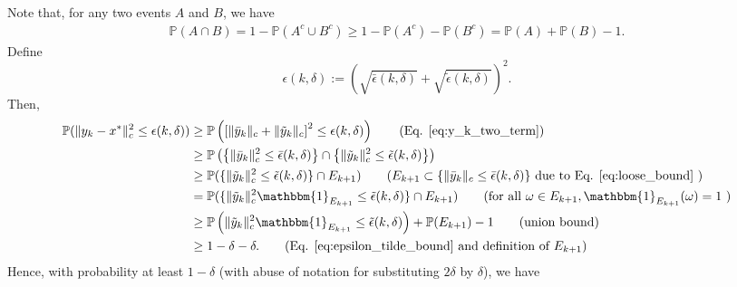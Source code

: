 \documentclass[letterpaper, 10 pt]{article}
\newcommand{\ty}{\tilde{y}}
\begin{document}
Note that, for any two events $A$ and $B$, we have
\begin{align*}
    \mathbb{P}(A\cap B)=1-\mathbb{P}(A^c\cup B^c)\geq 1-\mathbb{P}(A^c)-\mathbb{P}(B^c)=\mathbb{P}(A)+\mathbb{P}(B)-1.
\end{align*}
Define
\[ \epsilon(k,\delta) := \left(\sqrt{\bar{\epsilon}(k,\delta)} + \sqrt{\tilde{\epsilon}(k,\delta)}\right)^2. \]
Then,
\begin{align*}
    \mathbb{P}( \|y_k-x^*\|_c^2 \leq \epsilon(k,\delta)) &\geq \mathbb{P}\left( \left[ \|\bar{y}_k\|_c +  \|\tilde{y}_k\|_c\right]^2 \leq \epsilon(k,\delta)\right) \tag{Eq. \eqref{eq:y_k_two_term}}\\
    &\geq \mathbb{P}\left(  \left\{\|\bar{y}_k\|_c^2 \leq \bar{\epsilon}(k,\delta)\right\} \cap  \left\{\|\tilde{y}_k\|_c^2 \leq \tilde{\epsilon}(k,\delta)\right\}\right) \\
    &\geq \mathbb{P}( \{  \|\ty_k\|_c^2  \leq \tilde{\epsilon}(k,\delta) \} \cap E_{k+1}) \tag{$E_{k+1}\subset \left\{\|\bar{y}_k\|_c \leq \bar{\epsilon}(k,\delta)\right\}$ due to Eq. \eqref{eq:loose_bound} }\\
    &= \mathbb{P}( \{  \|\ty_k\|_c^2 \mathbbm{1}_{E_{k+1}} \leq \tilde{\epsilon}(k,\delta) \} \cap E_{k+1}) \tag{for all $\omega\in E_{k+1}, \mathbbm{1}_{E_{k+1}}(\omega)=1$ }\\
     &\geq \mathbb{P}\left( \|\ty_k\|_c^2 \mathbbm{1}_{E_{k+1}} \leq \tilde{\epsilon}(k,\delta) \right) + \mathbb{P}( E_{k+1}) -1 \tag{union bound}\\
     &\geq 1 - \delta - \delta.\tag{Eq. \eqref{eq:epsilon_tilde_bound} and definition of $E_{k+1}$}
\end{align*}
Hence, with probability at least $1-\delta$ (with abuse of notation for substituting $2\delta$ by $\delta$), we have
\end{document}
